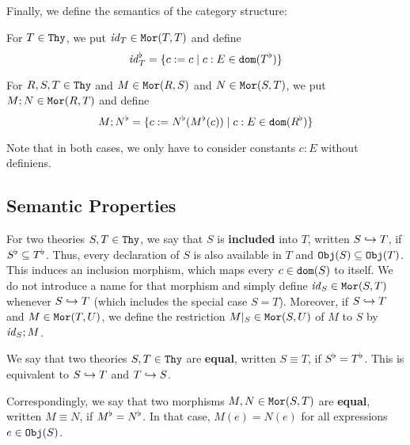Finally, we define the semantics of the category structure:
\begin{example}\label{sem:cat}
For $T\in\mathtt{Thy}$, we put $\mathit{id}_{T}\in\mathtt{Mor}(T,T)$ and define
\[\mathit{id}_{T}^\flat=\{c:=c \;|\; c:E\in\mathtt{dom}(T^\flat)\}\]

For $R,S,T\in\mathtt{Thy}$ and $M\in\mathtt{Mor}(R,S)$ and $N\in\mathtt{Mor}(S,T)$, we put $M;N\in\mathtt{Mor}(R,T)$ and define
\[M;N^\flat=\{c:=N^\flat(M^\flat(c)) \;|\; c:E\in\mathtt{dom}(R^\flat)\}\]

Note that in both cases, we only have to consider constants $c:E$ without definiens.
\end{example}


\subsection{Semantic Properties}

For two theories $S,T\in\mathtt{Thy}$, we say that $S$ is \textbf{included} into $T$, written $S\hookrightarrow T$, if $S^\flat\subseteq T^\flat$.
Thus, every declaration of $S$ is also available in $T$ and $\mathtt{Obj}(S)\subseteq\mathtt{Obj}(T)$.
This induces an inclusion morphism, which maps every $c\in\mathtt{dom}(S)$ to itself.
We do not introduce a name for that morphism and simply define $\mathit{id}_{S}\in\mathtt{Mor}(S,T)$ whenever $S\hookrightarrow T$ (which includes the special case $S=T$).
Moreover, if $S\hookrightarrow T$ and $M\in\mathtt{Mor}(T,U)$, we define the restriction $M|_S\in\mathtt{Mor}(S,U)$ of $M$ to $S$ by $\mathit{id}_{S};M$.

We say that two theories $S,T\in\mathtt{Thy}$ are \textbf{equal}, written $S\equiv T$, if $S^\flat=T^\flat$.
This is equivalent to $S\hookrightarrow T$ and $T\hookrightarrow S$.

Correspondingly, we say that two morphisms $M,N\in\mathtt{Mor}(S,T)$ are \textbf{equal}, written $M\equiv N$, if $M^\flat=N^\flat$.
In that case, $M(e)=N(e)$ for all expressions $e\in\mathtt{Obj}(S)$.


